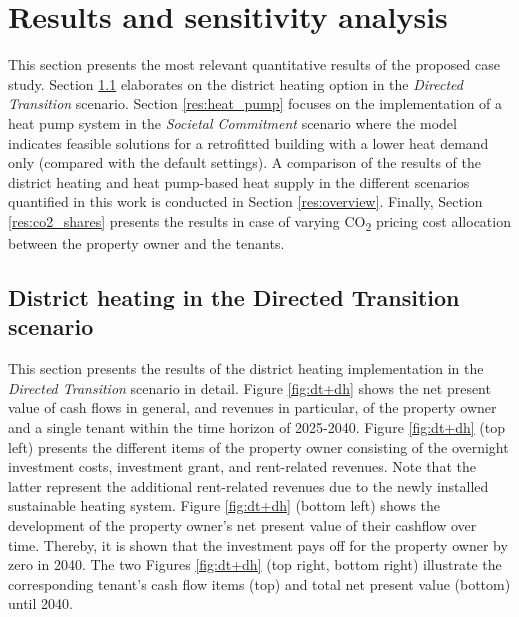 \section{Results and sensitivity analysis}\label{results}
This section presents the most relevant quantitative results of the proposed case study. Section \ref{res:district_heating} elaborates on the district heating option in the \textit{Directed Transition} scenario. Section \ref{res:heat_pump} focuses on the implementation of a heat pump system in the \textit{Societal Commitment} scenario where the model indicates feasible solutions for a retrofitted building with a lower heat demand only (compared with the default settings). A comparison of the results of the district heating and heat pump-based heat supply in the different scenarios quantified in this work is conducted in Section \ref{res:overview}. Finally, Section \ref{res:co2_shares} presents the results in case of varying CO\textsubscript{2} pricing cost allocation between the property owner and the tenants. 

\subsection{District heating in the Directed Transition scenario}\label{res:district_heating}
This section presents the results of the district heating implementation in the \textit{Directed Transition} scenario in detail. Figure \ref{fig:dt+dh} shows the net present value of cash flows in general, and revenues in particular, of the property owner and a single tenant within the time horizon of 2025-2040. Figure \ref{fig:dt+dh} (top left) presents the different items of the property owner consisting of the overnight investment costs, investment grant, and rent-related revenues. Note that the latter represent the additional rent-related revenues due to the newly installed sustainable heating system. Figure \ref{fig:dt+dh} (bottom left) shows the development of the property owner's net present value of their cashflow over time. Thereby, it is shown that the investment pays off for the property owner by zero in 2040. The two Figures \ref{fig:dt+dh} (top right, bottom right) illustrate the corresponding tenant's cash flow items (top) and total net present value (bottom) until 2040. 

